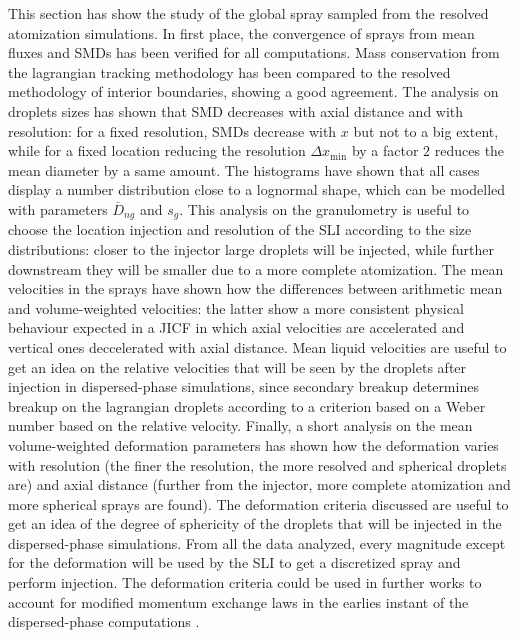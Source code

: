 This section has show the study of the global spray sampled from the resolved atomization simulations. In first place, the convergence of sprays from mean fluxes and SMDs has been verified for all computations. Mass conservation from the lagrangian tracking methodology has been compared to the resolved methodology of interior boundaries, showing a good agreement. The analysis on droplets sizes has shown that SMD decreases with axial distance and with resolution: for a fixed resolution, SMDs decrease with $x$ but not to a big extent, while for a fixed location reducing the resolution $\Delta x_\mathrm{min}$ by a factor $2$ reduces the mean diameter by a same amount. The histograms have shown that all cases display a number distribution close to a lognormal shape, which can be modelled with parameters $\overline{D}_{ng}$ and $s_g$. This analysis on the granulometry is useful to choose the location injection and resolution of the SLI according to the size distributions: closer to the injector large droplets will be injected, while further downstream they will be smaller due to a more complete atomization. The mean velocities in the sprays have shown how the differences between arithmetic mean and volume-weighted velocities: the latter show a more consistent physical behaviour expected in a JICF in which axial velocities are accelerated and vertical ones deccelerated with axial distance. Mean liquid velocities are useful to get an idea on the relative velocities that will be seen by the droplets after injection in dispersed-phase simulations, since secondary breakup determines breakup on the lagrangian droplets according to a criterion based on a Weber number based on the relative velocity. Finally, a short analysis on the mean volume-weighted deformation parameters has shown how the deformation varies with resolution (the finer the resolution, the more resolved and spherical droplets are) and axial distance (further from the injector, more complete atomization and more spherical sprays are found). The deformation criteria discussed are useful to get an idea of the degree of sphericity of the droplets that will be injected in the dispersed-phase simulations. From all the data analyzed, every magnitude except for the deformation will be used by the SLI to get a discretized spray and perform injection. The deformation criteria could be used in further works to account for modified momentum exchange laws in the earlies instant of the dispersed-phase computations .

\clearpage

